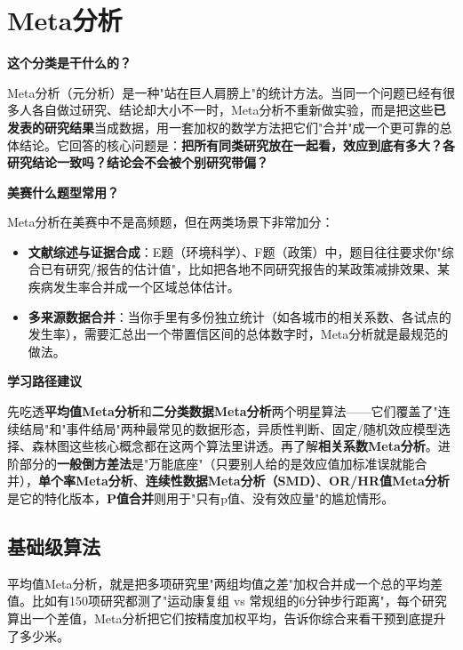 \chapter{Meta分析}

\begin{chapteroverview}
\textbf{这个分类是干什么的？}

Meta分析（元分析）是一种"站在巨人肩膀上"的统计方法。当同一个问题已经有很多人各自做过研究、结论却大小不一时，Meta分析不重新做实验，而是把这些\textbf{已发表的研究结果}当成数据，用一套加权的数学方法把它们"合并"成一个更可靠的总体结论。它回答的核心问题是：\textbf{把所有同类研究放在一起看，效应到底有多大？各研究结论一致吗？结论会不会被个别研究带偏？}

\textbf{美赛什么题型常用？}

Meta分析在美赛中不是高频题，但在两类场景下非常加分：
\begin{itemize}
    \item \textbf{文献综述与证据合成}：E题（环境科学）、F题（政策）中，题目往往要求你"综合已有研究/报告的估计值"，比如把各地不同研究报告的某政策减排效果、某疾病发生率合并成一个区域总体估计。
    \item \textbf{多来源数据合并}：当你手里有多份独立统计（如各城市的相关系数、各试点的发生率），需要汇总出一个带置信区间的总体数字时，Meta分析就是最规范的做法。
\end{itemize}

\textbf{学习路径建议}

先吃透\textbf{平均值Meta分析}和\textbf{二分类数据Meta分析}两个明星算法——它们覆盖了"连续结局"和"事件结局"两种最常见的数据形态，异质性判断、固定/随机效应模型选择、森林图这些核心概念都在这两个算法里讲透。再了解\textbf{相关系数Meta分析}。进阶部分的\textbf{一般倒方差法}是"万能底座"（只要别人给的是效应值加标准误就能合并），\textbf{单个率Meta分析}、\textbf{连续性数据Meta分析（SMD）}、\textbf{OR/HR值Meta分析}是它的特化版本，\textbf{P值合并}则用于"只有p值、没有效应量"的尴尬情形。
\end{chapteroverview}

\section{基础级算法}


\begin{algointro}
平均值Meta分析，就是把多项研究里"两组均值之差"加权合并成一个总的平均差值。比如有150项研究都测了"运动康复组 vs 常规组的6分钟步行距离"，每个研究算出一个差值，Meta分析把它们按精度加权平均，告诉你综合来看干预到底提升了多少米。
\end{algointro}

